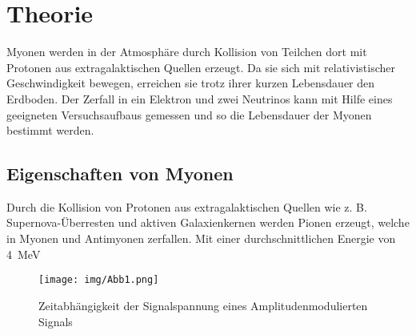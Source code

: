 \section{Theorie}

Myonen werden in der Atmosphäre durch Kollision von Teilchen dort mit Protonen aus extragalaktischen Quellen erzeugt. Da sie sich mit relativistischer Geschwindigkeit bewegen, erreichen sie trotz ihrer kurzen Lebensdauer den Erdboden. Der Zerfall in ein Elektron und zwei Neutrinos kann mit Hilfe eines geeigneten Versuchsaufbaus gemessen und so die Lebensdauer der Myonen bestimmt werden.

\subsection{Eigenschaften von Myonen}

Durch die Kollision von Protonen aus extragalaktischen Quellen wie z. B. Supernova-Überresten und aktiven Galaxienkernen werden Pionen erzeugt, welche in Myonen und Antimyonen zerfallen. Mit einer durchschnittlichen Energie von \SI{4}{\mega\electronvolt}\cite{PGD}

\begin{figure}[h]
	\centering
	\texttt{[image: img/Abb1.png]}
	\caption{Zeitabhängigkeit der Signalspannung eines Amplitudenmodulierten Signals \cite{FP}}
\end{figure}

